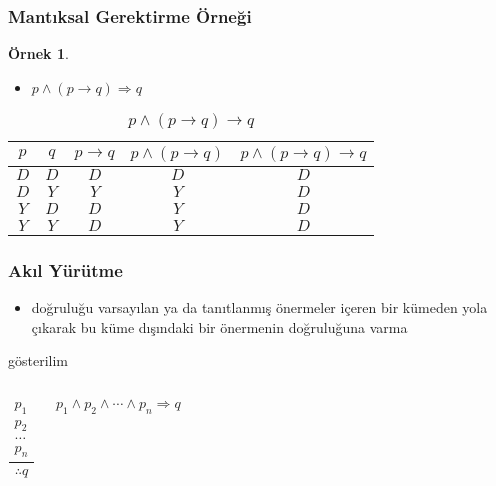 \documentclass[dvipsnames]{beamer}
\theoremstyle{definition}
\theoremstyle{example}
\newtheorem{ornek}[theorem]{Örnek}
\theoremstyle{plain}
\begin{document}
\begin{frame}
  \frametitle{Mantıksal Gerektirme Örneği}

  \begin{ornek}
    \begin{itemize}
      \item $p \wedge (p \rightarrow q) \Rightarrow q$
    \end{itemize}

    \begin{table}
      \caption{$p \wedge (p \rightarrow q) \rightarrow q$}
      \begin{tabular}{|c|c|c|c||c|}\hline
        $p$ & $q$ & $p \rightarrow q$ & $p \wedge (p \rightarrow q)$
            & $p \wedge (p \rightarrow q) \rightarrow q$\\\hline\hline
        $D$ & $D$ & $D$ & $D$ & $D$\\\hline
        $D$ & $Y$ & $Y$ & $Y$ & $D$\\\hline
        $Y$ & $D$ & $D$ & $Y$ & $D$\\\hline
        $Y$ & $Y$ & $D$ & $Y$ & $D$\\\hline
      \end{tabular}
    \end{table}
  \end{ornek}
\end{frame}

\begin{frame}
  \frametitle{Akıl Yürütme}

  \begin{itemize}
    \item doğruluğu varsayılan ya da tanıtlanmış önermeler içeren bir kümeden
      yola çıkarak bu küme dışındaki bir önermenin doğruluğuna varma
  \end{itemize}

  \pause
  \begin{block}{gösterilim}
    \begin{columns}
      \[
      \frac
        {
          \begin{array}{c}
            p_1\\
            p_2\\
            \dots\\
            p_n
          \end{array}
        }
        {
          \therefore q
        }
      \]

      $p_1 \wedge p_2 \wedge \cdots \wedge p_n \Rightarrow q$
    \end{columns}
  \end{block}
\end{frame}
\end{document}
